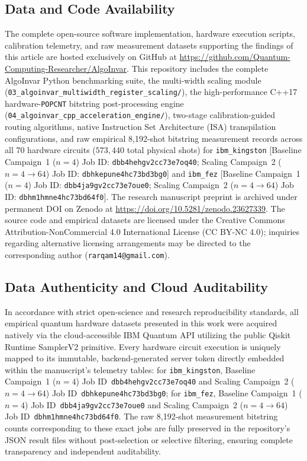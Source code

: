\documentclass[aps,pra,reprint,superscriptaddress,floatfix,nofootinbib]{revtex4-2}
\begin{document}
\subsection{Data and Code Availability}
The complete open-source software implementation, hardware execution scripts, calibration telemetry, and raw measurement datasets supporting the findings of this article are hosted exclusively on GitHub at \url{https://github.com/Quantum-Computing-Researcher/AlgoInvar}. This repository includes the complete AlgoInvar Python benchmarking suite, the multi-width scaling module (\texttt{03\_algoinvar\_multiwidth\_register\_scaling/}), the high-performance C++17 hardware-\texttt{POPCNT} bitstring post-processing engine (\texttt{04\_algoinvar\_cpp\_acceleration\_engine/}), two-stage calibration-guided routing algorithms, native Instruction Set Architecture (ISA) transpilation configurations, and raw empirical 8,192-shot bitstring measurement records across all 70 hardware circuits ($573,440$ total physical shots) for \texttt{ibm\_kingston} [Baseline Campaign~1 ($n = 4$) Job ID: \texttt{dbb4hehgv2cc73e7oq40}; Scaling Campaign~2 ($n = 4 \to 64$) Job ID: \texttt{dbhkepune4hc73bd3bg0}] and \texttt{ibm\_fez} [Baseline Campaign~1 ($n = 4$) Job ID: \texttt{dbb4ja9gv2cc73e7oue0}; Scaling Campaign~2 ($n = 4 \to 64$) Job ID: \texttt{dbhm1hmne4hc73bd64f0}]. The research manuscript preprint is archived under permanent DOI on Zenodo at \url{https://doi.org/10.5281/zenodo.23627339}. The source code and empirical datasets are licensed under the Creative Commons Attribution-NonCommercial 4.0 International License (CC BY-NC 4.0); inquiries regarding alternative licensing arrangements may be directed to the corresponding author (\texttt{rarqam14@gmail.com}).

\subsection{Data Authenticity and Cloud Auditability}
In accordance with strict open-science and research reproducibility standards, all empirical quantum hardware datasets presented in this work were acquired natively via the cloud-accessible IBM Quantum API utilizing the public Qiskit Runtime SamplerV2 primitive. Every hardware circuit execution is uniquely mapped to its immutable, backend-generated server token directly embedded within the manuscript's telemetry tables: for \texttt{ibm\_kingston}, Baseline Campaign~1 ($n = 4$) Job ID~\texttt{dbb4hehgv2cc73e7oq40} and Scaling Campaign~2 ($n = 4 \to 64$) Job ID~\texttt{dbhkepune4hc73bd3bg0}; for \texttt{ibm\_fez}, Baseline Campaign~1 ($n = 4$) Job ID~\texttt{dbb4ja9gv2cc73e7oue0} and Scaling Campaign~2 ($n = 4 \to 64$) Job ID~\texttt{dbhm1hmne4hc73bd64f0}. The raw 8,192-shot measurement bitstring counts corresponding to these exact jobs are fully preserved in the repository's JSON result files without post-selection or selective filtering, ensuring complete transparency and independent auditability.
\end{document}
